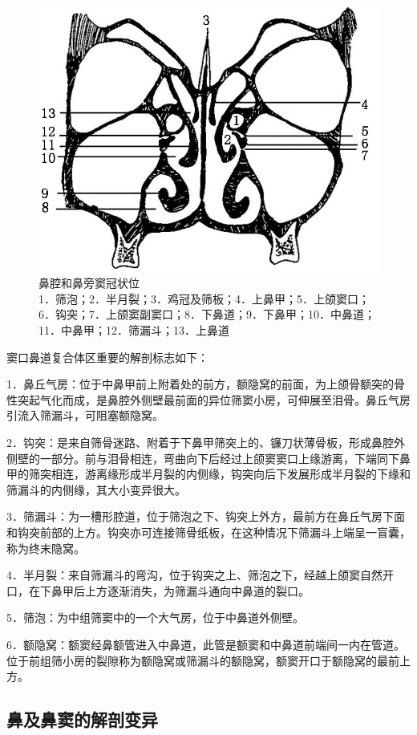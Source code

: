 \begin{figure}[!htbp]
 \centering
 \includegraphics[width=.7\textwidth,height=\textheight,keepaspectratio]{./images/Image00122.jpg}
 \captionsetup{justification=centering}
 \caption{鼻腔和鼻旁窦冠状位\\{\small 1．筛泡；2．半月裂；3．鸡冠及筛板；4．上鼻甲；5．上颌窦口；6．钩突；7．上颌窦副窦口；8．下鼻道；9．下鼻甲；10．中鼻道；11．中鼻甲；12．筛漏斗；13．上鼻道}}
 \label{fig5-1}
  \end{figure} 

窦口鼻道复合体区重要的解剖标志如下：

1．鼻丘气房：位于中鼻甲前上附着处的前方，额隐窝的前面，为上颌骨额突的骨性突起气化而成，是鼻腔外侧壁最前面的异位筛窦小房，可伸展至泪骨。鼻丘气房引流入筛漏斗，可阻塞额隐窝。

2．钩突：是来自筛骨迷路、附着于下鼻甲筛突上的、镰刀状薄骨板，形成鼻腔外侧壁的一部分。前与泪骨相连，弯曲向下后经过上颌窦窦口上缘游离，下端同下鼻甲的筛突相连，游离缘形成半月裂的内侧缘，钩突向后下发展形成半月裂的下缘和筛漏斗的内侧缘，其大小变异很大。

3．筛漏斗：为一槽形腔道，位于筛泡之下、钩突上外方，最前方在鼻丘气房下面和钩突前部的上方。钩突亦可连接筛骨纸板，在这种情况下筛漏斗上端呈一盲囊，称为终末隐窝。

4．半月裂：来自筛漏斗的弯沟，位于钩突之上、筛泡之下，经越上颌窦自然开口，在下鼻甲后上方逐渐消失，为筛漏斗通向中鼻道的裂口。

5．筛泡：为中组筛窦中的一个大气房，位于中鼻道外侧壁。

6．额隐窝：额窦经鼻额管进入中鼻道，此管是额窦和中鼻道前端间一内在管道。位于前组筛小房的裂隙称为额隐窝或筛漏斗的额隐窝，额窦开口于额隐窝的最前上方。

\subsection{鼻及鼻窦的解剖变异}

